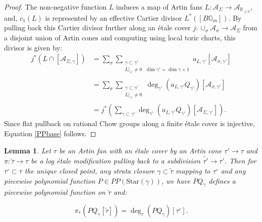 \documentclass[12pt, oneside]{amsart}   	%
\newcounter{thm}
\newtheorem{lemma}[thm]{Lemma}
\numberwithin{equation}{section}
\numberwithin{thm}{section}
\numberwithin{figure}{section}
\begin{document}
 

\begin{proof}
The non-negative function $L$ induces a map of Artin fans $L: \mathcal{A}_{\Sigma} \rightarrow \mathcal{A}_{\mathbb{R}_{\ge 0}}$, and, $c_1(L)$ is represented by an effective Cartier divisor $L^*([B\mathbb{G}_m])$. By pulling back this Cartier divisor further along an \'etale cover $j:\cup_{\sigma}\mathcal{A}_{\sigma} \rightarrow \mathcal{A}_{\Sigma}$ from a disjoint union of Artin cones and computing using local toric charts, this divisor is given by:
\begin{equation}
\begin{split}
j^*(L\cap [\mathcal{A}_{\Sigma,\gamma}]) &= \sum_{\sigma}\sum_{\substack{\gamma \subset \gamma'\\L|_{\gamma'} \not= 0\text{ }\dim\gamma' = \dim \gamma + 1}} a_{L,\gamma'}[\mathcal{A}_{\sigma,\gamma'}]\\ &= \sum_{\sigma}\sum_{\substack{\gamma \subset \gamma'\\L|_{\gamma'} \not= 0}} \deg_{\gamma'}(a_{L,\gamma'}Q_{\gamma'})[\mathcal{A}_{\sigma,\gamma'}]\\
&= j^*( \sum_{\gamma \subset \gamma'} \deg_{\gamma'}(a_{L,\gamma'}Q_{\gamma'})[\mathcal{A}_{\Sigma,\gamma'}]).
\end{split}
\end{equation}
Since flat pullback on rational Chow groups along a finite \'etale cover is injective, Equation \ref{PPbase} follows.

%

\end{proof}

\begin{lemma}\label{tbund1}
Let $\tau$ be an Artin fan with an \'etale cover by an Artin cone $\tau' \rightarrow \tau$ and $\pi: \tilde{\tau} \rightarrow \tau$ be a log \'etale modification pulling back to a subdivision $\tilde{\tau'} \rightarrow \tau'$. Then for $\tau^\circ \subset \tau$ the unique closed point, any strata closure $\gamma \subset \tilde{\tau}$ mapping to $\tau^\circ$ and any piecewise polynomial function $P \in PP(\text{Star}(\gamma))$, we have $PQ_{\gamma}$ defines a piecewise polynomial function on $\tilde{\tau}$ and:

\begin{equation}\label{ptbund}
\pi_*(PQ_{\gamma}[\tilde{\tau}]) = \deg_{\tau}(PQ_\gamma)[\tau^{\circ}].
\end{equation}

\end{lemma}
\end{document}
